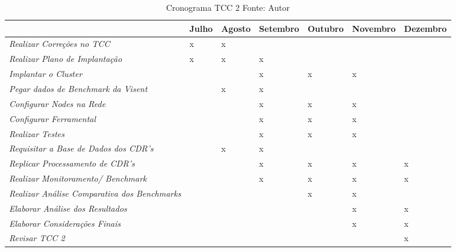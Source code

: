         \begin{table}[!ht]
            \begin{center}
              \begin{tabular}{|p{7cm}|p{1cm}|p{1.1cm}|p{1.5cm}|p{1.5cm}|p{1.7cm}|p{1.7cm}|}
                \hline
                \centering{Atividades} & Julho & Agosto & Setembro & Outubro & Novembro & Dezembro
                \\ \hline
                \textit{Realizar Correções no TCC} & x & x & & & &
                \\ \hline
                \textit{Realizar Plano de Implantação}& x & x & x & & &
                \\ \hline
                \textit{Implantar o Cluster} & & & x & x & x &
                \\ \hline
                \textit{Pegar dados de Benchmark da Visent} & & x & x & & &
                \\ \hline
                \textit{Configurar Nodes na Rede} & & & x & x & x &
                \\ \hline
                \textit{Configurar Ferramental} & & & x & x & x &
                \\ \hline
                \textit{Realizar Testes} & & & x & x & x &
                \\ \hline
                \textit{Requisitar a Base de Dados dos CDR's} & & x & x & & &
                \\ \hline
                \textit{Replicar Processamento de CDR's} & & & x & x & x & x
                \\ \hline
                \textit{Realizar Monitoramento/ Benchmark} & & & x & x & x & x
                \\ \hline
                \textit{Realizar Análise Comparativa dos Benchmarks} & & & & x & x &
                \\ \hline
                \textit{Elaborar Análise dos Resultados} & & & & & x & x
                \\ \hline
                \textit{Elaborar Considerações Finais} & & & & & x & x
                \\ \hline
                \textit{Revisar TCC 2} & & & & & & x
                \\ \hline
              \end{tabular}
              \caption[Cronograma TCC 2]{Cronograma TCC 2
              \protect \linebreak Fonte: Autor}
            \label{tabela5}
            \end{center}
        \end{table}

